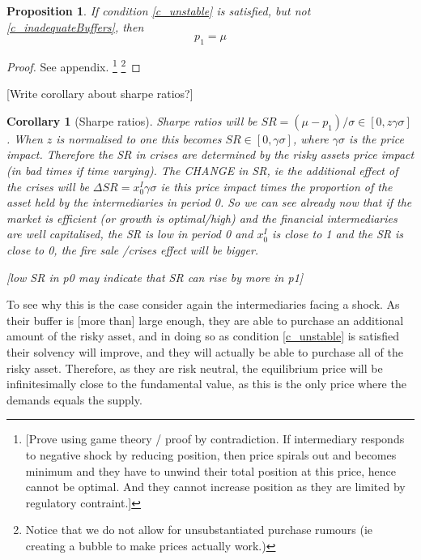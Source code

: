 \documentclass[11pt]{article}
\newtheorem{proposition}{Proposition}
\newtheorem{corollary}{Corollary}
\begin{document}
\begin{proposition} \label{p_pricewBuffer}
If condition \ref{c_unstable} is satisfied, but not \ref{c_inadequateBuffers}, then 
\begin{equation}
p_1 = \mu
\end{equation}
\end{proposition}
\begin{proof}
See appendix.
\footnote{[Prove using game theory / proof by contradiction. If intermediary responds to negative shock by reducing position, then price spirals out and becomes minimum and they have to unwind their total position at this price, hence cannot be optimal. And they cannot increase position as they are limited by regulatory contraint.]}
\footnote{Notice that we do not allow for unsubstantiated purchase rumours (ie creating a bubble to make prices actually work.)}
\end{proof}

[Write corollary about sharpe ratios?] 
\begin{corollary}[Sharpe ratios]
Sharpe ratios will be $SR = ( \mu - p_1 ) / \sigma \in [0,z\gamma\sigma]$. When $z$ is normalised to one this becomes $SR \in [0,\gamma\sigma]$, where $\gamma\sigma$ is the price impact. Therefore the SR in crises are determined by the risky assets price impact (in bad times if time varying). The CHANGE in SR, ie the additional effect of the crises will be $\Delta SR = x^I_0\gamma\sigma$ ie this price impact times the proportion of the asset held by the intermediaries in period 0. So we can see already now that if the market is efficient (or growth is optimal/high) and the financial intermediaries are well capitalised, the SR is low in period 0 and $x^I_0$ is close to 1 and the SR is close to 0, the fire sale /crises effect will be bigger.

[low SR in p0 may indicate that SR can rise by more in p1]

\end{corollary}



To see why this is the case consider again the intermediaries facing a shock. As their buffer is [more than] large enough, they are able to purchase an additional amount of the risky asset, and in doing so as condition \ref{c_unstable} is satisfied their solvency will improve, and they will actually be able to purchase all of the risky asset. Therefore, as they are risk neutral, the equilibrium price will be infinitesimally close to the fundamental value, as this is the only price where the demands equals the supply.
\end{document}
